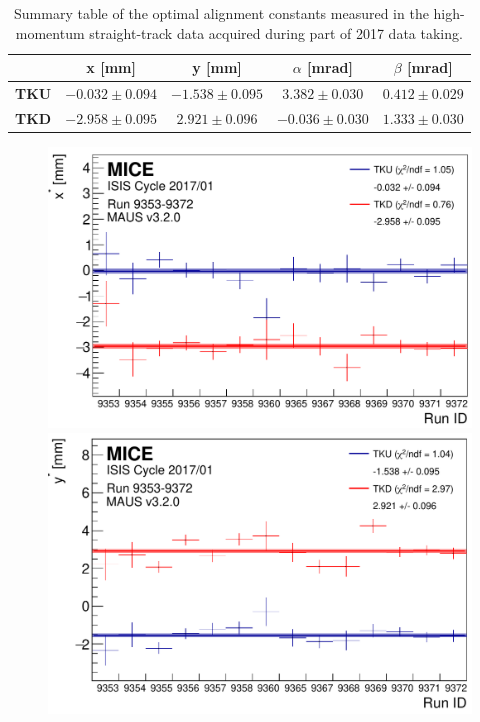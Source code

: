 \begin{table}[ht!]
	\centering
		\begin{tabular}{l|c|c|c|c}
			& \textbf{x [mm]} & \textbf{y [mm]} & \textbf{$\alpha$ [mrad]} & \textbf{$\beta$ [mrad]} \\
			\hline
			\textbf{TKU} & $-0.032\pm0.094$ & $-1.538\pm0.095$ & $ 3.382\pm0.030$ & $0.412\pm0.029$ \\
			\textbf{TKD} & $-2.958\pm0.095$ & $ 2.921\pm0.096$ & $-0.036\pm0.030$ & $1.333\pm0.030$
		\end{tabular}
	\caption{Summary table of the optimal alignment constants measured in the high-momentum straight-track data acquired during part of 2017 data taking.}
	\label{tab:201701_constants}
\end{table}

\begin{figure} [!htb]
	\centering
	\begin{minipage}[b]{.45\textwidth}
		\centering
		\includegraphics[width=\textwidth]{data_final/x_bestfit_edit.pdf}
	\end{minipage}
	\hfill
	\begin{minipage}[b]{.45\textwidth}
		\centering
		\includegraphics[width=\textwidth]{data_final/y_bestfit_edit.pdf}
	\end{minipage}
	

\end{figure}
